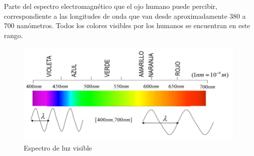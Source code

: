 Parte del espectro electromagnético que el ojo humano puede percibir, correspondiente a las longitudes de onda que van desde aproximadamente 380 a 700 nanómetros. Todos los colores visibles por los humanos se encuentran en este rango.

\begin{figure}[H]
  \centering
  \includegraphics[scale=0.5]{imagenes/luz_visible.png}
  \caption{Espectro de luz visible\cite{fraybecerra}}
\end{figure}
